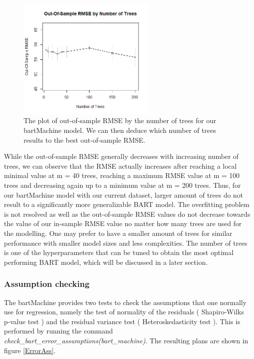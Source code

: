 \documentclass{usiinftr}
\begin{document}
\begin{figure}[h!] 
\centering
\includegraphics[width=0.6\textwidth]{images/RMSEtrees.png}
\caption{The plot of out-of-sample RMSE by the number of trees for our bartMachine model. We can then deduce which number of trees results to the best out-of-sample RMSE.}
\label{RMSEtrees}
\end{figure}

While the out-of-sample RMSE generally decreases with increasing number of trees, we can observe that the RMSE actually increases after reaching a local minimal value at m = 40 trees, reaching a maximum RMSE value at m = 100 trees and decreasing again up to a minimum value at m = 200 trees. Thus, for our bartMachine model with our current dataset, larger amount of trees do not result to a significantly more generalizable BART model. The overfitting problem is not resolved as well as the out-of-sample RMSE values do not decrease towards the value of our in-sample RMSE value no matter how many trees are used for the modelling. One may prefer to have a smaller amount of trees for similar performance with smaller model sizes and less complexities. The number of trees is one of the hyperparameters that can be tuned to obtain the most optimal performing BART model, which will be discussed in a later section.

\subsubsection{Assumption checking}
The bartMachine provides two tests to check the assumptions that one normally use for regression, namely the test of normality of the residuals ( Shapiro-Wilks p-value test ) and the residual variance test ( Heteroskedasticity test ). This is performed by running the command \textit{check\_bart\_error\_assumptions(bart\_machine)}. The resulting plans are shown in figure \ref{ErrorAss}.
\end{document}
